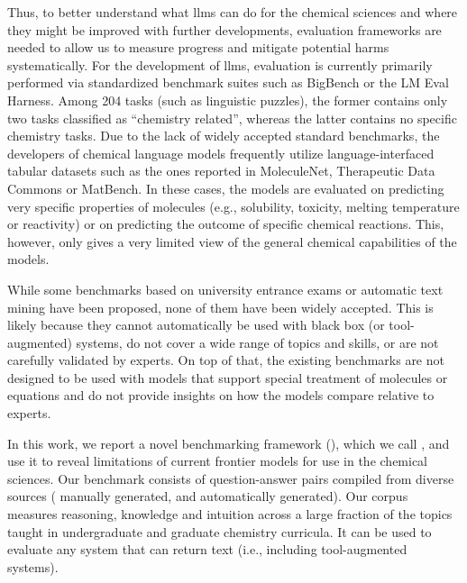 \documentclass[11pt, oneside]{article}
\begin{document}
\begin{refsection}
Thus, to better understand what \glspl{llm} can do for the chemical sciences and where they might be improved with further developments, evaluation frameworks are needed to allow us to measure progress and mitigate potential harms systematically.
For the development of \glspl{llm}, evaluation is currently primarily performed via standardized benchmark suites such as BigBench\autocite{srivastava2022beyond} or the LM Eval Harness.\autocite{eval-harness}
Among 204 tasks (such as linguistic puzzles), the former contains only two tasks classified as \enquote{chemistry related}, whereas the latter contains no specific chemistry tasks.
Due to the lack of widely accepted standard benchmarks, the developers of chemical language models\autocite{jablonka2024leveraging, guo2023large, ahmad2022chemberta2, Cai_2024, frey2023neural} frequently utilize language-interfaced\autocite{dinh2022lift} tabular datasets such as the ones reported in MoleculeNet,\autocite{wu2018moleculenet} Therapeutic Data Commons\autocite{huang2021therapeutics} or MatBench.\autocite{Dunn_2020}
In these cases, the models are evaluated on predicting very specific properties of molecules (e.g., solubility, toxicity, melting temperature or reactivity) or on predicting the outcome of specific chemical reactions.
This, however, only gives a very limited view of the general chemical capabilities of the models.

While some benchmarks based on university entrance exams\autocite{Zaki_2024, arora2023llms} or automatic text mining\autocite{song2023honeybee, wei2021chemistryqa, song-etal-2023-matsci} have been proposed, none of them have been widely accepted.
This is likely because they cannot automatically be used with black box (or tool-augmented) systems, do not cover a wide range of topics and skills, or are not carefully validated by experts.
On top of that, the existing benchmarks are not designed to be used with models that support special treatment of molecules or equations and do not provide insights on how the models compare relative to experts.

In this work, we report a novel benchmarking framework  (), which we call \chembench, and use it to reveal limitations of current frontier models for use in the chemical sciences.
Our benchmark consists of \xspace question-answer pairs compiled from diverse sources (\xspace manually generated, and \xspace automatically generated).  
Our corpus measures reasoning, knowledge and intuition across a large fraction of the topics taught in undergraduate and graduate chemistry curricula. It can be used to evaluate any system that can return text (i.e., including tool-augmented systems).


\end{refsection}
\end{document}
